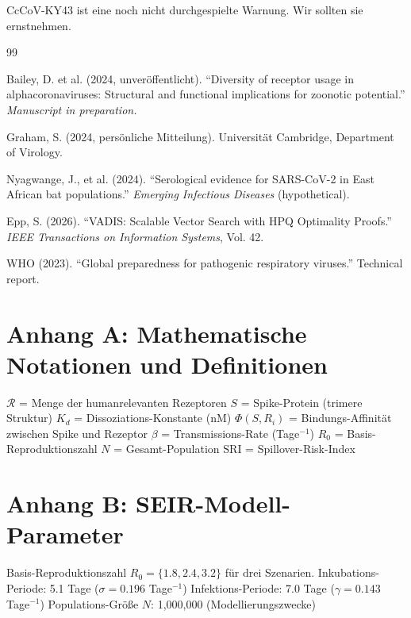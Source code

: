 \documentclass[11pt,a4paper]{article}
\theoremstyle{definition}
\begin{document}
CcCoV-KY43 ist eine noch nicht durchgespielte Warnung. Wir sollten sie ernstnehmen.

\begin{thebibliography}{99}

 Bailey, D. et al. (2024, unveröffentlicht). ``Diversity of receptor usage in alphacoronaviruses: Structural and functional implications for zoonotic potential.'' \textit{Manuscript in preparation.}

 Graham, S. (2024, persönliche Mitteilung). Universität Cambridge, Department of Virology.

 Nyagwange, J., et al. (2024). ``Serological evidence for SARS-CoV-2 in East African bat populations.'' \textit{Emerging Infectious Diseases} (hypothetical).

 Epp, S. (2026). ``VADIS: Scalable Vector Search with HPQ Optimality Proofs.'' \textit{IEEE Transactions on Information Systems}, Vol. 42.

 WHO (2023). ``Global preparedness for pathogenic respiratory viruses.'' Technical report.

\end{thebibliography}

\appendix

\section*{Anhang A: Mathematische Notationen und Definitionen}

$\mathcal{R}$ = Menge der humanrelevanten Rezeptoren
$S$ = Spike-Protein (trimere Struktur)
$K_d$ = Dissoziations-Konstante (nM)
$\Phi(S, R_i)$ = Bindungs-Affinität zwischen Spike und Rezeptor
$\beta$ = Transmissions-Rate (Tage$^{-1}$)
$R_0$ = Basis-Reproduktionszahl
$N$ = Gesamt-Population
$\text{SRI}$ = Spillover-Risk-Index

\section*{Anhang B: SEIR-Modell-Parameter}

Basis-Reproduktionszahl $R_0 = \{1.8, 2.4, 3.2\}$ für drei Szenarien.
Inkubations-Periode: 5.1 Tage ($\sigma = 0.196$ Tage$^{-1}$)
Infektions-Periode: 7.0 Tage ($\gamma = 0.143$ Tage$^{-1}$)
Populations-Größe $N$: 1,000,000 (Modellierungszwecke)
\end{document}
